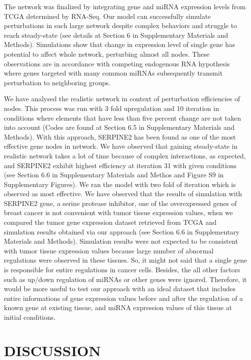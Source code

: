 \documentclass[a4,center,fleqn]{NAR}
\begin{document}
The network was finalized by integrating gene and miRNA expression
levels from TCGA determined by RNA-Seq. Our model can successfully
simulate perturbations in such large network despite complex behaviors
and struggle to reach steady-state (see details at Section 6 in
Supplementary Materials and Methods). Simulations show that change in
expression level of single gene has potential to affect whole network,
perturbing almost all nodes. These observations are in accordance with
competing endogenous RNA hypothesis where genes targeted with many
common miRNAs subsequently transmit perturbation to neighboring groups.

We have analysed the realistic network in context of perturbation
efficiencies of nodes. This process was run with 3 fold upregulation and
10 iteration in conditions where elements that have less than five
percent change are not taken into account (Codes are found at Section
6.5 in Supplementary Materials and Methods). With this approach,
SERPINE2 has been found as one of the most effective gene nodes in
network. We have observed that gaining steady-state in realistic network
takes a lot of time because of complex interactions, as expected, and
SERPINE2 exhibit highest efficiency at iteration 31 with given
conditions (see Section 6.6 in Supplementary Materials and Methos and
Figure S9 in Supplementary Figures). We ran the model with two fold of
iteration which is observed as most effective. We have observed that the
results of simulation with SERPINE2 gene, a serine protease inhibitor,
one of the overexpressed genes of breast cancer
\citep{yang2018expression, candia2006protease} is not convenient with
tumor tissue expression values, when we compared the tumor gene
expression dataset retrieved from TCGA and simulation results obtained
via our approach (see Section 6.6 in Supplementary Materials and
Methods). Simulation results were not expected to be consistent with
tumor tissue expression values because large number of abnormal
regulations were observed in these tissues. So, it might not said that a
single gene is responsible for entire regulations in cancer cells.
Besides, the all other factors such as up/down regulation of miRNAs or
other genes were ignored. Therefore, it would be more useful to test our
approach with an ideal dataset that includes entire informations of gene
expression values before and after the regulation of a known gene at
existing tissue, and miRNA expression values of this tissue at initial
conditions.

\section{DISCUSSION}
\end{document}
